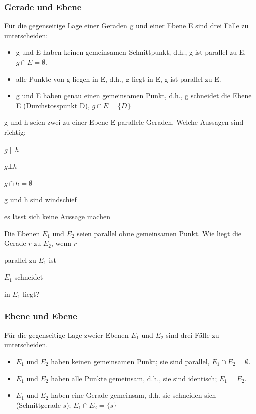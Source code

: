 \documentclass[%
11pt,%
twoside,%
titlepage,%
a4page,%
german,%
headsepline%
]{scrartcl}
\begin{document}
\subsubsection{Gerade und Ebene}
F\"ur die gegenseitige Lage einer Geraden g und einer Ebene E sind drei F\"alle zu unterscheiden:
\begin{itemize}
\item g und E haben keinen gemeinsamen Schnittpunkt, d.h., g ist parallel zu E, $g\cap E=\emptyset$.
\item alle Punkte von g liegen in E, d.h., g liegt in E, g ist parallel zu E.
\item g und E haben genau einen gemeinsamen Punkt, d.h., g schneidet die Ebene E (Durchstosspunkt D), $g\cap E=\{D\}$
\end{itemize}

\begin{ueb}
g und h seien zwei zu einer Ebene E parallele Geraden. Welche Aussagen sind richtig:
\begin{enumeratea}
\item $g\| h$
\item $g\bot h$
\item $g\cap h=\emptyset$
\item g und h sind windschief
\item es l\"asst sich keine Aussage machen
\end{enumeratea}
\end{ueb}

\begin{ueb}
Die Ebenen $E_1$ und $E_2$ seien parallel ohne gemeinsamen Punkt. Wie liegt die Gerade $r$ zu $E_2$, wenn $r$
\begin{enumeratea}
\item parallel zu $E_1$ ist
\item $E_1$ schneidet
\item in $E_1$ liegt?
\end{enumeratea}
\end{ueb}

\subsubsection{Ebene und Ebene}
F\"ur die gegenseitige Lage zweier Ebenen $E_1$ und $E_2$ sind drei F\"alle zu unterscheiden.
\begin{itemize}
\item $E_1$ und $E_2$ haben keinen gemeinsamen Punkt; sie sind parallel, $E_1\cap E_2=\emptyset$.
\item $E_1$ und $E_2$ haben alle Punkte gemeinsam, d.h., sie sind identisch; $E_1=E_2$.
\item $E_1$ und $E_2$ haben eine Gerade gemeinsam, d.h. sie schneiden sich (Schnittgerade $s$); $E_1\cap E_2=\{s\}$
\end{itemize}
\end{document}
